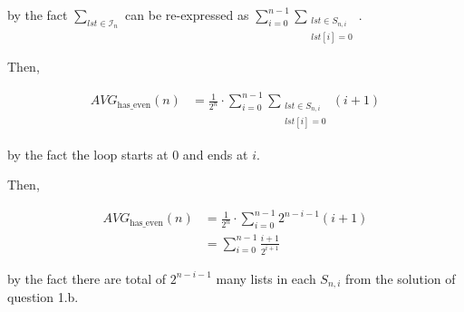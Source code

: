 \documentclass[12pt]{article}
\begin{document}
\begin{enumerate}[a.]
    by the fact $\sum\limits_{lst \in \mathcal{I}_n}$ can be re-expressed as $\sum\limits_{i=0}^{n-1} \sum\limits_{\substack{lst \in S_{n,i}\\ lst[i]=0}}$.

    \bigskip

    Then,

    \begin{align}
        AVG_{\text{has\_even}}(n) &= \frac{1}{2^n} \cdot \sum\limits_{i=0}^{n-1} \sum\limits_{\substack{lst \in S_{n,i}\\ lst[i]=0}} (i+1)
    \end{align}

    by the fact the loop starts at $0$ and ends at $i$.

    \bigskip

    Then,

    \begin{align}
        AVG_{\text{has\_even}}(n) &= \frac{1}{2^n} \cdot \sum\limits_{i=0}^{n-1} 2^{n-i-1} (i+1)\\
        &= \sum\limits_{i=0}^{n-1} \frac{i+1}{2^{i+1}}
    \end{align}

    by the fact there are total of $2^{n-i-1}$ many lists in each $S_{n,i}$ from
    the solution of question 1.b.

\end{enumerate}
\end{document}
